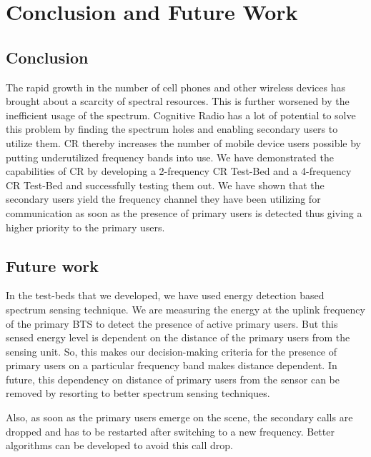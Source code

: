 \chapter{Conclusion and Future Work}

\section{Conclusion}
The rapid growth in the number of cell phones and other wireless devices has 
brought about a scarcity of spectral resources. This is further worsened by the
inefficient usage of the spectrum. Cognitive Radio has a lot of potential to solve this problem
by finding the spectrum holes and enabling secondary users to utilize them. CR 
thereby increases the number of mobile device users possible by putting 
underutilized frequency bands into use. We have 
demonstrated the capabilities of CR by developing a 2-frequency CR Test-Bed and
a 4-frequency CR Test-Bed and successfully testing them out.  We have shown
that the secondary users yield the frequency channel they have been utilizing
for communication as soon as the presence of primary users is detected thus
giving a higher priority to the primary users.


\section{Future work}
In the test-beds that we developed, we have used energy detection based spectrum sensing
technique. We are measuring the energy at the uplink frequency of the primary BTS 
to detect the presence of active primary users. But this sensed energy level is dependent
on the distance of the primary users from the sensing unit. So, this makes our 
decision-making criteria for the presence of primary users on a particular 
frequency band makes distance dependent. 
In future, this dependency on
distance of primary users from the sensor can be removed by resorting to better 
spectrum sensing techniques.

Also, as soon as the primary users emerge on the scene, the secondary calls 
are dropped and has to be restarted after switching to a new frequency. Better
algorithms can be developed to avoid this call drop.